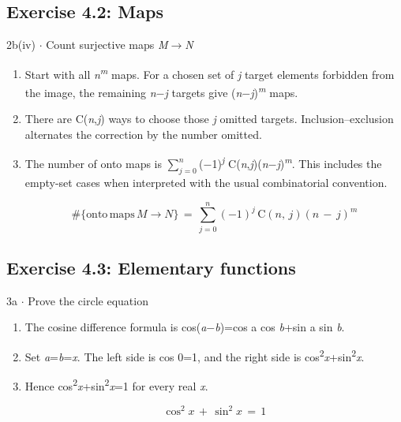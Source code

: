 \documentclass[11pt]{article}
\begin{document}
\begin{keepsection}\subsection{Exercise 4.2: Maps}

\begin{workedbox}{2b(iv) \ensuremath{\cdot} Count surjective maps \textit{M}\ensuremath{\to}\textit{N}}
\begin{enumerate}
\item Start with all \textit{n}\textsuperscript{\textit{m}} maps. For a chosen set of \textit{j} target elements forbidden from the image, the remaining \textit{n}\ensuremath{-}\textit{j} targets give (\textit{n}\ensuremath{-}\textit{j})\textsuperscript{\textit{m}} maps.
\item There are C(\textit{n},\textit{j}) ways to choose those \textit{j} omitted targets. Inclusion–exclusion alternates the correction by the number omitted.
\item {}
The number of onto maps is $\sum_{{j}=0}^{{n}} $(\ensuremath{-}1)\textsuperscript{\textit{j}} C(\textit{n},\textit{j})(\textit{n}\ensuremath{-}\textit{j})\textsuperscript{\textit{m}}. This includes the empty-set cases when interpreted with the usual combinatorial convention.

\begin{equation*}\#\{\text{onto}\, \text{maps}\, {M}\to {N}\}\, =\, \sum_{{j}=0}^{{n}} (-1)^{{j}}\, \mathrm{C}({n},\, {j})({n}\, -\, {j})^{{m}}\end{equation*}
\end{enumerate}
\end{workedbox}

\end{keepsection}
\begin{keepsection}\subsection{Exercise 4.3: Elementary functions}

\begin{workedbox}{3a \ensuremath{\cdot} Prove the circle equation}
\begin{enumerate}
\item The cosine difference formula is cos(\textit{a}\ensuremath{-}\textit{b})=cos a cos \textit{b}+sin a sin \textit{b}.
\item Set \textit{a}=\textit{b}=\textit{x}. The left side is cos 0=1, and the right side is cos\textsuperscript{2}\textit{x}+sin\textsuperscript{2}\textit{x}.
\item {}
Hence cos\textsuperscript{2}\textit{x}+sin\textsuperscript{2}\textit{x}=1 for every real \textit{x}.

\begin{equation*}\cos ^{2}{x}\, +\, \sin ^{2}{x}\, =\, 1\end{equation*}
\end{enumerate}
\end{workedbox}

\end{keepsection}
\end{document}

